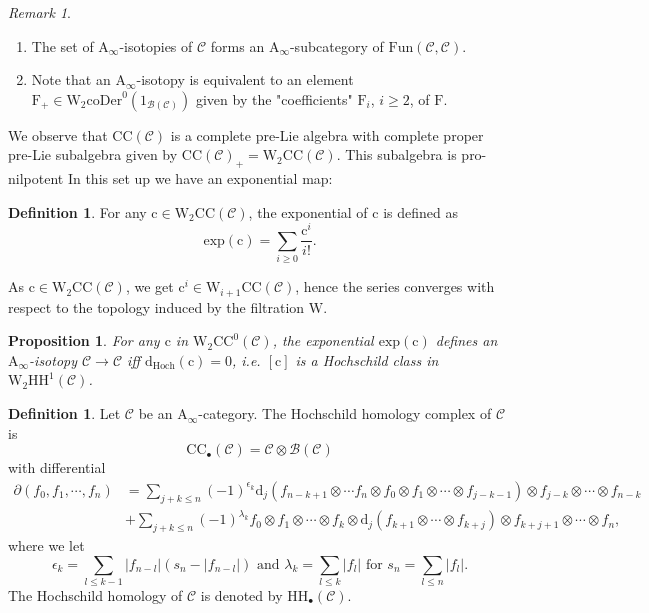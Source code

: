\documentclass{article}
\theoremstyle{plain}
\newtheorem{proposition}[theorem]{Proposition}
\theoremstyle{definition}
\newtheorem{definition}[theorem]{Definition}
\theoremstyle{remark}
\newtheorem{remark}[theorem]{Remark}
\newcommand{\mr}{\mathrm}
\newcommand{\Aa}{\mr{A}_{\infty}}
\newcommand{\Cc}{\mathcal C}
\newcommand{\3}{\vspace{3mm}}
\newcommand{\2}{\vspace{2mm}}
\newcommand{\1}{\vspace{1mm}}
\begin{document}
\2
\begin{remark}
\begin{enumerate}
\item The set of $\Aa$-isotopies of $\Cc$ forms an $\Aa$-subcategory of $\mr{Fun}(\Cc,\Cc)$.
\item Note that an $\Aa$-isotopy is equivalent to an element $\mr{F}_{+}\in \mr{W}_2\mr{coDer}^{0}\left(1_{\mathcal{B}(\Cc)}\right)$ given by the "coefficients" $\mr{F}_i$, $i\ge 2$, of $\mr{F}$.
\end{enumerate} 
\end{remark}
\2
We observe that $\mr{CC}(\Cc)$ is a complete pre-Lie algebra with complete proper pre-Lie subalgebra given by $\mr{CC}(\Cc)_+=\mr{W}_2\mr{CC}(\Cc)$. This subalgebra is pro-nilpotent In this set up we have an exponential map:
\2
\begin{definition}
For any $\mr{c}\in \mr{W}_2\mr{CC}(\Cc)$, the exponential of $\mr{c}$ is defined as $$\mr{exp}(\mr{c})=\sum_{i \ge 0}\frac{\mr{c}^i}{i!}.$$ 
\end{definition}
\2
As $\mr{c}\in \mr{W}_2\mr{CC}(\Cc)$, we get $\mr{c}^i\in \mr{W}_{i+1}\mr{CC}(\Cc)$, hence the series converges with respect to the topology induced by the filtration $\mr{W}$.
\2
\begin{proposition}
For any $\mr{c}$ in $\mr{W}_2\mr{CC}^0(\Cc)$, the exponential $\mr{exp}(\mr{c})$ defines an $\Aa$-isotopy $\Cc\to \Cc$ iff $\mr{d}_\mr{Hoch}(\mr{c})=0$, i.e. $[\mr{c}]$ is a Hochschild class in $\mr{W}_2\mr{HH}^1(\Cc)$.
\end{proposition}
\2
\begin{definition}
Let $\mathcal{C}$ be an $\Aa$-category. The Hochschild homology complex of $\mathcal{C}$ is $$\mr{CC}_\bullet(\mathcal{C})=\mathcal{C}\otimes \mathcal{B}(\mathcal{C})$$ with differential \begin{align*}\partial(f_0,f_1,\cdots,f_n)&=\sum_{j+k\le n}(-1)^{\epsilon_k}\mr{d}_j(f_{n-k+1}\otimes \cdots f_n \otimes f_0\otimes  f_1\otimes \cdots \otimes f_{j-k-1})\otimes f_{j-k}\otimes \cdots\otimes  f_{n-k}\\&+ \sum_{j+k\le n} (-1)^{\lambda_k}f_0\otimes f_1\otimes \cdots\otimes f_k\otimes \mr{d}_{j}(f_{k+1}\otimes \cdots \otimes f_{k+j})\otimes f_{k+j+1}\otimes \cdots\otimes f_n,\end{align*} where we let $$\epsilon_k=\sum_{l\le k-1}|f_{n-l}|(s_n-|f_{n-l}|) \text{ and } \lambda_k = \sum_{l\le k}|f_l| \text{ for } s_n=\sum_{l\le n}|f_l|.$$
The Hochschild homology of $\mathcal{C}$ is denoted by $\mr{HH}_\bullet(\mathcal{C})$.
\end{definition}
\end{document}
